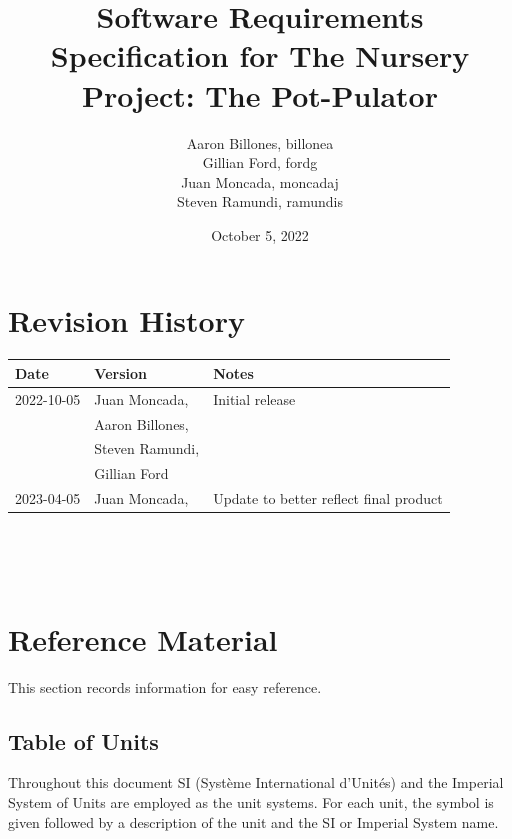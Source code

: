\documentclass[12pt]{article}
\begin{document}
\title{Software Requirements Specification for The Nursery Project: The Pot-Pulator} 
\author{Aaron Billones, billonea\\Gillian Ford, fordg\\Juan Moncada, moncadaj\\Steven Ramundi, ramundis}
\date{October 5, 2022}
	
\maketitle

\section*{Revision History}

\begin{tabularx}{\textwidth}{p{3cm}p{4cm}X}
\toprule {\bf Date} & {\bf Version} & {\bf Notes}\\
\midrule
2022-10-05 & Juan Moncada,& Initial release\\&Aaron Billones,\\&Steven Ramundi,\\&Gillian Ford \\
2023-04-05 & Juan Moncada,& Update to better reflect final product\\
\bottomrule
\end{tabularx}

~\newpage


\tableofcontents

~\newpage

\section{Reference Material}

This section records information for easy reference.

\subsection{Table of Units}

Throughout this document SI (Syst\`{e}me International d'Unit\'{e}s) and the Imperial System of Units are employed
as the unit systems. For each unit, the symbol is given followed by a
description of the unit and the SI or Imperial System name.
~\newline
\end{document}

